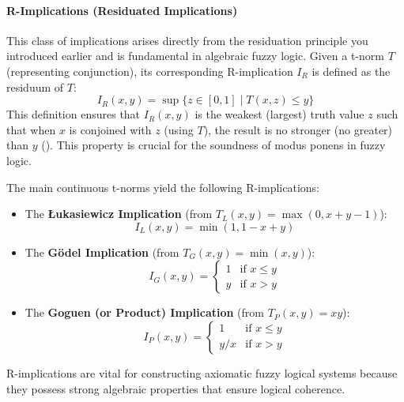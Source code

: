 \paragraph{R-Implications (Residuated Implications)}
This class of implications arises directly from the residuation principle you introduced earlier and is fundamental in algebraic fuzzy logic. Given a t-norm $T$ (representing conjunction), its corresponding R-implication $I_R$ is defined as the residuum of $T$:
\[I_R(x,y) = \sup \{z \in [0,1] \mid T(x,z) \le y\}\]
This definition ensures that $I_R(x,y)$ is the weakest (largest) truth value $z$ such that when $x$ is conjoined with $z$ (using $T$), the result is no stronger (no greater) than $y$ (\cite[Def. 2.1.5, p.29]{Hajek1998}). This property is crucial for the soundness of modus ponens in fuzzy logic. 
\begin{example}
The main continuous t-norms yield the following R-implications:
\begin{itemize}
    \item The \textbf{Łukasiewicz Implication} (from $T_L(x,y) = \max(0, x+y-1)$):
    \[I_L(x,y) = \min(1, 1-x+y)\]
    \item The \textbf{Gödel Implication} (from $T_G(x,y) = \min(x,y)$):
    \[I_G(x,y) = \begin{cases} 1 & \text{if } x \le y \\ y & \text{if } x > y \end{cases}\]
    \item The \textbf{Goguen (or Product) Implication} (from $T_P(x,y) = xy$):
    \[I_P(x,y) = \begin{cases} 1 & \text{if } x \le y \\ y/x & \text{if } x > y \end{cases}\]
\end{itemize}
\end{example}
R-implications are vital for constructing axiomatic fuzzy logical systems because they possess strong algebraic properties that ensure logical coherence. 

